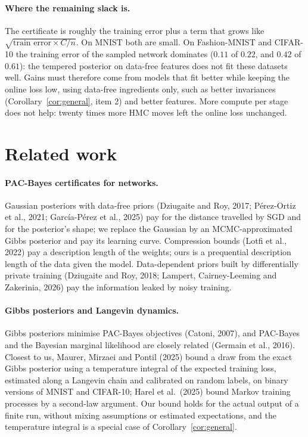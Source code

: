 \documentclass[11pt]{article}
\theoremstyle{definition}
\theoremstyle{remark}
\begin{document}
\paragraph{Where the remaining slack is.} The certificate is roughly the training error plus a term that grows like
$\sqrt{\text{train error}\times C/n}$. On MNIST both are small. On Fashion-MNIST and CIFAR-10 the training error of the
sampled network dominates ($0.11$ of $0.22$, and $0.42$ of $0.61$): the tempered posterior on data-free features does not
fit these datasets well. Gains must therefore come from models that fit better while keeping the online loss low, using
data-free ingredients only, such as better invariances (Corollary~\ref{cor:general}, item 2) and better features. More
compute per stage does not help: twenty times more HMC moves left the online loss unchanged.

\section{Related work}\label{sec:related}
\paragraph{PAC-Bayes certificates for networks.} Gaussian posteriors with data-free priors (Dziugaite and Roy, 2017;
P\'erez-Ortiz et al., 2021; Garc\'ia-P\'erez et al., 2025) pay for the distance travelled by SGD and for the posterior's
shape; we replace the Gaussian by an MCMC-approximated Gibbs posterior and pay its learning curve. Compression bounds
(Lotfi et al., 2022) pay a description length of the weights; ours is a prequential description length of the data given
the model. Data-dependent priors built by differentially private training (Dziugaite and Roy, 2018; Lampert,
Cairney-Leeming and Zakerinia, 2026) pay the information leaked by noisy training.
\paragraph{Gibbs posteriors and Langevin dynamics.} Gibbs posteriors minimise PAC-Bayes objectives (Catoni, 2007), and
PAC-Bayes and the Bayesian marginal likelihood are closely related (Germain et al., 2016). Closest to us, Maurer, Mirzaei
and Pontil (2025) bound a draw from the exact Gibbs posterior using a temperature integral of the expected training loss,
estimated along a Langevin chain and calibrated on random labels, on binary versions of MNIST and CIFAR-10; Harel et al.\
(2025) bound Markov training processes by a second-law argument. Our bound holds for the actual output of a finite run,
without mixing assumptions or estimated expectations, and the temperature integral is a special case of
Corollary~\ref{cor:general}.
\end{document}
